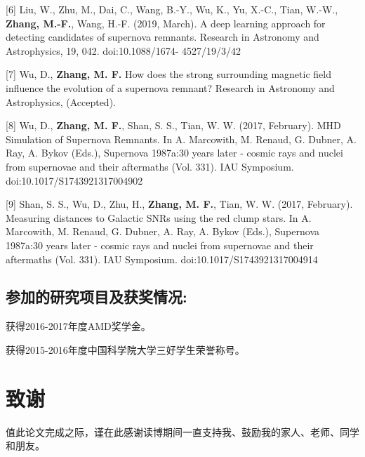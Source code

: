 [6] Liu, W., Zhu, M., Dai, C., Wang, B.-Y., Wu, K., Yu, X.-C., Tian, W.-W., \textbf{Zhang, M.-F.}, Wang, H.-F. (2019, March). A deep learning
approach for detecting candidates of supernova remnants. Research in Astronomy and Astrophysics, 19, 042. doi:10.1088/1674-
4527/19/3/42

[7] Wu, D., \textbf{Zhang, M. F.} How does the strong surrounding magnetic field influence the evolution of a supernova remnant? Research
in Astronomy and Astrophysics, (Accepted).

[8] Wu, D., \textbf{Zhang, M. F.}, Shan, S. S., Tian, W. W. (2017, February). MHD Simulation of Supernova Remnants. In A. Marcowith, M.
Renaud, G. Dubner, A. Ray, A. Bykov (Eds.), Supernova 1987a:30 years later - cosmic rays and nuclei from supernovae and their
aftermaths (Vol. 331). IAU Symposium. doi:10.1017/S1743921317004902

[9] Shan, S. S., Wu, D., Zhu, H., \textbf{Zhang, M. F.}, Tian, W. W. (2017, February). Measuring distances to Galactic SNRs using the red
clump stars. In A. Marcowith, M. Renaud, G. Dubner, A. Ray, A. Bykov (Eds.), Supernova 1987a:30 years later - cosmic rays and
nuclei from supernovae and their aftermaths (Vol. 331). IAU Symposium. doi:10.1017/S1743921317004914

\section*{参加的研究项目及获奖情况:}

获得2016-2017年度AMD奖学金。

获得2015-2016年度中国科学院大学三好学生荣誉称号。

\chapter[致谢]{致\quad 谢}%
\thispagestyle{noheaderstyle}%

值此论文完成之际，谨在此感谢读博期间一直支持我、鼓励我的家人、老师、同学和朋友。

